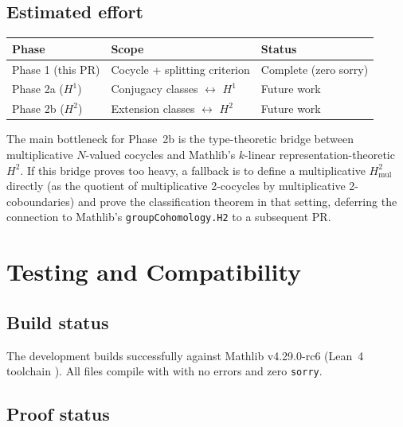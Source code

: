 \documentclass[11pt]{article}
\begin{document}
\subsection{Estimated effort}

\begin{center}
\begin{tabular}{lll}
\toprule
\textbf{Phase} & \textbf{Scope} & \textbf{Status} \\
\midrule
Phase 1 (this PR) & Cocycle + splitting criterion & Complete (zero sorry) \\
Phase 2a ($H^1$) & Conjugacy classes $\leftrightarrow$ $H^1$ & Future work \\
Phase 2b ($H^2$) & Extension classes $\leftrightarrow$ $H^2$ & Future work \\
\bottomrule
\end{tabular}
\end{center}

The main bottleneck for Phase~2b is the type-theoretic bridge between multiplicative
$N$-valued cocycles and Mathlib's $k$-linear representation-theoretic $H^2$. If this
bridge proves too heavy, a fallback is to define a multiplicative $H^2_{\mathrm{mul}}$
directly (as the quotient of multiplicative 2-cocycles by multiplicative 2-coboundaries)
and prove the classification theorem in that setting, deferring the connection to
Mathlib's \texttt{groupCohomology.H2} to a subsequent PR.

\section{Testing and Compatibility}\label{sec:testing}

\subsection{Build status}

The development builds successfully against Mathlib v4.29.0-rc6 (Lean~4 toolchain\linebreak
{}). All files compile with 
with no errors and zero \texttt{sorry}.

\subsection{Proof status}\label{sec:sorry}
\end{document}
